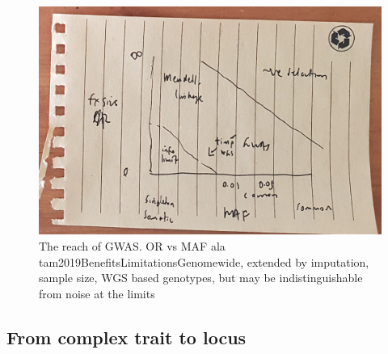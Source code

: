 \begin{outline}
\begin{figure}
    \centering
    \includegraphics[width=1.0\textwidth,page=1]{mainmatter/figures/chapter_01/fig_mockup_architecture_Screenshot 2020-05-21 at 17.08.41.png}
    \caption{The reach of GWAS. OR vs MAF ala tam2019BenefitsLimitationsGenomewide, extended by imputation, sample size, WGS based genotypes, but may be indistinguishable from noise at the limits}
    \label{fig:intro_architectureGWAS}
\end{figure}

\subsection{From complex trait to locus}


\end{outline}
